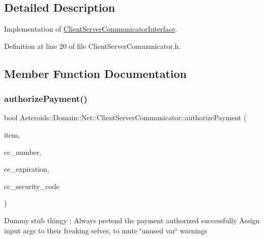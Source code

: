 \subsection{Detailed Description}
Implementation of \hyperlink{classAsteroids_1_1Domain_1_1Net_1_1ClientServerCommunicatorInterface}{Client\+Server\+Communicator\+Interface}. 

Definition at line 20 of file Client\+Server\+Communicator.\+h.



\subsection{Member Function Documentation}
\mbox{\label{classAsteroids_1_1Domain_1_1Net_1_1ClientServerCommunicator_abf768675ef72169877377e923510e9a5}} 
\subsubsection{\texorpdfstring{authorize\+Payment()}{authorizePayment()}}
{\footnotesize\ttfamily bool Asteroids\+::\+Domain\+::\+Net\+::\+Client\+Server\+Communicator\+::authorize\+Payment (\begin{DoxyParamCaption}\item[{std\+::shared\+\_\+ptr$<$ \hyperlink{classAsteroids_1_1Domain_1_1Store_1_1STORE__ITEM__INTERFACE}{Asteroids\+::\+Domain\+::\+Store\+::\+S\+T\+O\+R\+E\+\_\+\+I\+T\+E\+M\+\_\+\+I\+N\+T\+E\+R\+F\+A\+CE} $>$}]{item,  }\item[{std\+::string}]{cc\+\_\+number,  }\item[{std\+::string}]{cc\+\_\+expiration,  }\item[{std\+::string}]{cc\+\_\+security\+\_\+code }\end{DoxyParamCaption})\hspace{0.3cm}{\ttfamily [virtual]}}

Dummy stub thingy ; Always pretend the payment authorized successfully Assign input args to their freaking selves, to mute \char`\"{}unused var\char`\"{} warnings 

